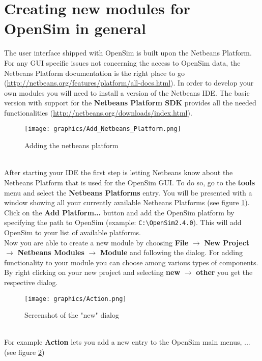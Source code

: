 \documentclass[a4paper]{scrartcl}
\begin{document}
\section{Creating new modules for OpenSim in general}
\label{sec:new-models-opensim}
The user interface shipped with OpenSim is built upon the Netbeans Platform. For any GUI specific issues not concerning the access to OpenSim data, the Netbeans Platform documentation is the right place to go (\href{http://netbeans.org/features/platform/all-docs.html}{http://netbeans.org/features/platform/all-docs.html}).
In order to develop your own modules you will need to install a version of the Netbeans IDE.
The basic version with support for the \textbf{Netbeans Platform SDK} provides all  the needed functionalities (\href{http://netbeans.org/downloads/index.html}{http://netbeans.org/downloads/index.html}).
\begin{figure}[h]
    \centering
    \texttt{[image: graphics/Add\_Netbeans\_Platform.png]}
    \caption{Adding the netbeans platform}
    \label{fig:platform}
\end{figure}\\
After starting your IDE the first step is letting Netbeans know about the Netbeans Platform that is used for the OpenSim GUI. To do so, go to the \textbf{tools} menu and select the \textbf{Netbeans Platforms} entry. You will be presented with a window showing all your currently available Netbeans Platforms (see figure \ref{fig:platform}). Click on the \textbf{Add Platform...} button and add the OpenSim platform by specifying the path to OpenSim (example: \verb|C:\OpenSim2.4.0|). This will add OpenSim to your list of available platforms.\\
Now you are able to create a new module by choosing \textbf{File} $\rightarrow$ \textbf{New Project} $\rightarrow$ \textbf{Netbeans Modules} $\rightarrow$ \textbf{Module} and following the dialog.
For adding functionality to your module you can choose among various types of components. By right clicking on your new project and selecting \textbf{new} $\rightarrow$ \textbf{other} you get the respective dialog. 
\begin{figure}[h]
    \centering
    \texttt{[image: graphics/Action.png]}
    \caption{Screenshot of the "new" dialog}
    \label{fig:action}
\end{figure}\\
For example \textbf{Action} lets you add a new entry to the OpenSim main menus, ... (see figure \ref{fig:action})
\end{document}
